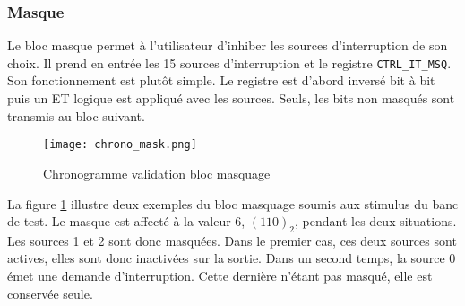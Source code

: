 \subsubsection{Masque}

Le bloc masque permet à l'utilisateur d'inhiber les sources d'interruption de son choix.
Il prend en entrée les 15 sources d'interruption et le registre \texttt{CTRL\_IT\_MSQ}.
Son fonctionnement est plutôt simple.
Le registre est d'abord inversé bit à bit puis un ET logique est appliqué avec les sources.
Seuls, les bits non masqués sont transmis au bloc suivant.
\begin{figure}[H]
    \centering
    \texttt{[image: chrono\_mask.png]}
    \caption{Chronogramme validation bloc masquage}
    \label{fig:chrono_mask}
\end{figure}
La figure \ref{fig:chrono_mask} illustre deux exemples du bloc masquage soumis aux stimulus du banc de test.
Le masque est affecté à la valeur 6, $(110)_2$, pendant les deux situations.
Les sources 1 et 2 sont donc  masquées.
Dans le premier cas, ces deux sources sont actives, elles sont donc inactivées sur la sortie.
Dans un second temps, la source 0 émet une demande d'interruption.
Cette dernière n'étant pas masqué, elle est conservée seule.
